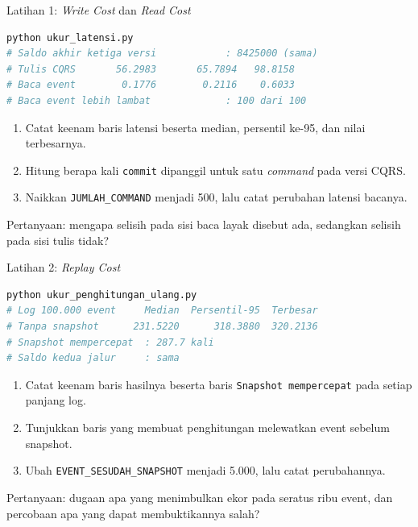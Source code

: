 \documentclass[aspectratio=169, table, 12pt]{beamer}
\begin{document}
\begin{frame}[fragile]{{\Large Latihan 1: \textit{Write Cost} dan \textit{Read Cost}}}
  \vspace{3pt}
\begin{lstlisting}[language=bash, basicstyle=\ttfamily\tiny]
python ukur_latensi.py
# Saldo akhir ketiga versi            : 8425000 (sama)
# Tulis CQRS       56.2983       65.7894   98.8158
# Baca event        0.1776        0.2116    0.6033
# Baca event lebih lambat             : 100 dari 100
\end{lstlisting}

  \vspace{3pt}
  \begin{enumerate}\small
    \item Catat keenam baris latensi beserta median, persentil ke-95, dan nilai
          terbesarnya.
    \item Hitung berapa kali \texttt{commit} dipanggil untuk satu \textit{command} pada
          versi CQRS.
    \item Naikkan \texttt{JUMLAH\_COMMAND} menjadi 500, lalu catat perubahan
          latensi bacanya.
  \end{enumerate}

  \vspace{3pt}
  {\small Pertanyaan: mengapa selisih pada sisi baca layak disebut ada,
  sedangkan selisih pada sisi tulis tidak?}
\end{frame}

\begin{frame}[fragile]{{\Large Latihan 2: \textit{Replay Cost}}}
  \vspace{3pt}
\begin{lstlisting}[language=bash, basicstyle=\ttfamily\tiny]
python ukur_penghitungan_ulang.py
# Log 100.000 event     Median  Persentil-95  Terbesar
# Tanpa snapshot      231.5220      318.3880  320.2136
# Snapshot mempercepat  : 287.7 kali
# Saldo kedua jalur     : sama
\end{lstlisting}

  \vspace{3pt}
  \begin{enumerate}\small
    \item Catat keenam baris hasilnya beserta baris \texttt{Snapshot
          mempercepat} pada setiap panjang log.
    \item Tunjukkan baris yang membuat penghitungan melewatkan event
          sebelum snapshot.
    \item Ubah \texttt{EVENT\_SESUDAH\_SNAPSHOT} menjadi 5.000, lalu catat
          perubahannya.
  \end{enumerate}

  \vspace{3pt}
  {\small Pertanyaan: dugaan apa yang menimbulkan ekor pada seratus ribu event,
  dan percobaan apa yang dapat membuktikannya salah?}
\end{frame}
\end{document}
